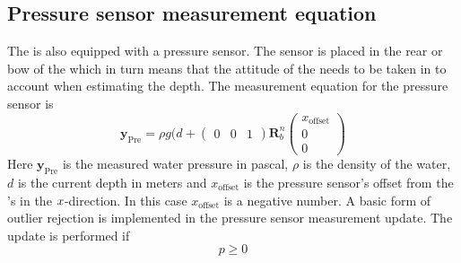 \subsection{Pressure sensor measurement equation}
The \abbrROV is also equipped with a pressure sensor. The sensor is placed in the rear or bow of the \abbrROV which in turn means that the attitude of the \abbrROV needs to be taken in to account when estimating the depth.
The measurement equation for the pressure sensor is
\begin{equation}
 \boldsymbol{y}_{\text{Pre}}=  \rho g (d + \begin{pmatrix}
    0 & 0 & 1
\end{pmatrix} \boldsymbol{R}^n_b 
\begin{pmatrix}
x_{\text{offset}}\\
0\\
0
\end{pmatrix}
\end{equation}
Here $\boldsymbol{y}_{\text{Pre}}$ is the measured water pressure in pascal, $\rho$ is the density of the water, $d$ is the current depth in meters and $x_{\text{offset}}$ is the pressure sensor's offset from the \abbrROV's \abbrCO in the $x$-direction. In this case $x_{\textrm{offset}}$ is a negative number. A basic form of outlier rejection is implemented in the pressure sensor measurement update. The update is performed if
\begin{equation}
    p \geq 0
\end{equation}